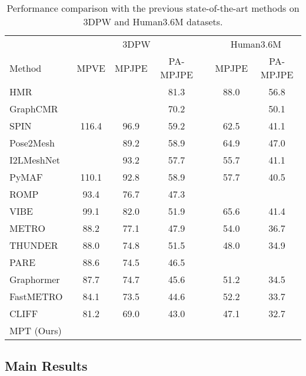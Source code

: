 \begin{table}[t]
\centering
{} 
\begin{tabular}{lcccccc}
    \toprule[1.5pt]
    \multirow{1}{*}{} & \multicolumn{3}{c}{3DPW} & & \multicolumn{2}{c}{Human3.6M}\\ 
    \cline{2-4}\cline{6-7}
	Method  & MPVE  & MPJPE  & PA-MPJPE  & &  MPJPE  & PA-MPJPE  \\
	\midrule
	HMR~\cite{kanazawa2018end} &  &  & 81.3 && 88.0 & 56.8  \\
	GraphCMR~\cite{kolotouros2019convolutional} &  &  & 70.2 &&  & 50.1\\
	SPIN~\cite{kolotouros2019learning} & 116.4 & 96.9 & 59.2 && 62.5 & 41.1\\
	Pose2Mesh~\cite{Choi_2020_ECCV_Pose2Mesh} &  & 89.2 & 58.9 && 64.9 & 47.0\\
	I2LMeshNet~\cite{Moon_2020_ECCV_I2L-MeshNet} &  & 93.2 & 57.7 && 55.7 & 41.1\\
	PyMAF~\cite{zhang2021pymaf} & 110.1 & 92.8 & 58.9 && 57.7 & 40.5\\
	ROMP~\cite{sun2021monocular} & 93.4 & 76.7 & 47.3 &&  & \\
	VIBE~\cite{kocabas2019vibe} & 99.1 & 82.0 & 51.9 && 65.6 & 41.4\\
    METRO~\cite{lin2020end} & 88.2 & 77.1 & 47.9 && 54.0 & 36.7\\
    THUNDER~\cite{zanfir2021thundr} & 88.0 & 74.8 & 51.5 && 48.0 & 34.9\\
    PARE~\cite{kocabas2021pare} & 88.6 & 74.5 & 46.5 &&  & \\
    Graphormer~\cite{lin2021mesh} & 87.7 & 74.7 & 45.6 && 51.2 & 34.5\\
	FastMETRO~\cite{cho2022FastMETRO} & 84.1 & 73.5 & 44.6 && 52.2 & 33.7\\
	CLIFF~\cite{li2022cliff} & 81.2 & 69.0 & 43.0 && 47.1 & 32.7\\
    \midrule
    MPT (Ours) &  &  &  &&  & \\
	\bottomrule[1.5pt]
\end{tabular}
\caption{Performance comparison with the previous state-of-the-art methods on 3DPW and Human3.6M datasets.}
\label{tbl:compare-h36m-3dpw}
\vspace{-4mm}
\end{table}

 
\subsection{Main Results}

